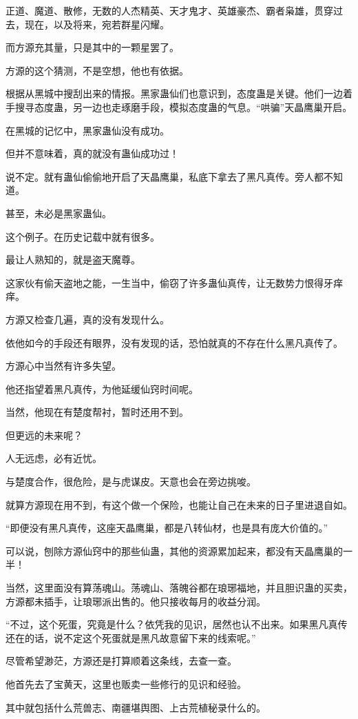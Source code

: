 \begin{this_body}
正道、魔道、散修，无数的人杰精英、天才鬼才、英雄豪杰、霸者枭雄，贯穿过去，现在，以及将来，宛若群星闪耀。

而方源充其量，只是其中的一颗星罢了。

方源的这个猜测，不是空想，他也有依据。

根据从黑城中搜刮出来的情报。黑家蛊仙们也意识到，态度蛊是关键。他们一边着手搜寻态度蛊，另一边也走琢磨手段，模拟态度蛊的气息。“哄骗”天晶鹰巢开启。

在黑城的记忆中，黑家蛊仙没有成功。

但并不意味着，真的就没有蛊仙成功过！

说不定。就有蛊仙偷偷地开启了天晶鹰巢，私底下拿去了黑凡真传。旁人都不知道。

甚至，未必是黑家蛊仙。

这个例子。在历史记载中就有很多。

最让人熟知的，就是盗天魔尊。

这家伙有偷天盗地之能，一生当中，偷窃了许多蛊仙真传，让无数势力恨得牙痒痒。

方源又检查几遍，真的没有发现什么。

依他如今的手段还有眼界，没有发现的话，恐怕就真的不存在什么黑凡真传了。

方源心中当然有许多失望。

他还指望着黑凡真传，为他延缓仙窍时间呢。

当然，他现在有楚度帮衬，暂时还用不到。

但更远的未来呢？

人无远虑，必有近忧。

与楚度合作，很危险，是与虎谋皮。天意也会在旁边挑唆。

就算方源现在用不到，有这个做一个保险，也能让自己在未来的日子里进退自如。

“即便没有黑凡真传，这座天晶鹰巢，都是八转仙材，也是具有庞大价值的。”

可以说，刨除方源仙窍中的那些仙蛊，其他的资源累加起来，都没有天晶鹰巢的一半！

当然，这里面没有算荡魂山。荡魂山、落魄谷都在琅琊福地，并且胆识蛊的买卖，方源都未插手，让琅琊派出售的。他只接收每月的收益分润。

“不过，这个死蛋，究竟是什么？依凭我的见识，居然也认不出来。如果黑凡真传还在的话，说不定这个死蛋就是黑凡故意留下来的线索呢。”

尽管希望渺茫，方源还是打算顺着这条线，去查一查。

他首先去了宝黄天，这里也贩卖一些修行的见识和经验。

其中就包括什么荒兽志、南疆堪舆图、上古荒植秘录什么的。


\end{this_body}
